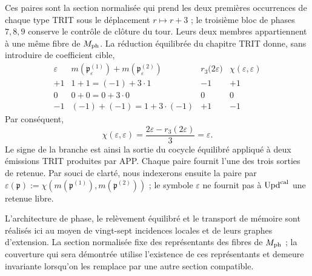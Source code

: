 Ces paires sont la section normalisée qui prend les deux premières occurrences de chaque type TRIT sous le déplacement \(r\mapsto r+3\) ; le troisième bloc de phases \(7,8,9\) conserve le contrôle de clôture du tour. Leurs deux membres appartiennent à une même fibre de \(M_{\rm ph}\). La réduction équilibrée du chapitre TRIT donne, sans introduire de coefficient cible,
\begin{equation}
 \begin{array}{c|c|c|c}
 \varepsilon&m(\mathfrak p_\varepsilon^{(1)})
                  +m(\mathfrak p_\varepsilon^{(2)})
   &r_3\bigl(2\varepsilon\bigr)&
   \chi(\varepsilon,\varepsilon)\\ \hline
 +1&1+1=(-1)+3\cdot1&-1&+1\\
 0&0+0=0+3\cdot0&0&0\\
 -1&(-1)+(-1)=1+3\cdot(-1)&+1&-1
 \end{array}
 \label{eq:tres-carry-derivados-ch}
\end{equation}
Par conséquent,
\begin{equation}
 \chi(\varepsilon,\varepsilon)
 =\frac{2\varepsilon-r_3(2\varepsilon)}3=\varepsilon.
 \label{eq:carry-no-parametrico-ch}
\end{equation}
Le signe de la branche est ainsi la sortie du cocycle équilibré appliqué à deux
émissions TRIT produites par APP. Chaque paire fournit l’une des trois
sorties de retenue. Par souci de clarté, nous indexerons ensuite la paire par
\(\varepsilon(\mathfrak p):=
\chi(m(\mathfrak p^{(1)}),m(\mathfrak p^{(2)}))\) ; le symbole
\(\varepsilon\) ne fournit pas à \(\operatorname{Upd}^{\rm cal}\) une retenue libre.

L’architecture de phase, le relèvement équilibré et le transport de
mémoire sont réalisés ici au moyen de vingt-sept incidences locales et de leurs
graphes d’extension. La section normalisée fixe des représentants des
fibres de \(M_{\rm ph}\) ; la couverture qui sera démontrée utilise l’existence
de ces représentants et demeure invariante lorsqu’on les remplace par une autre
section compatible.

